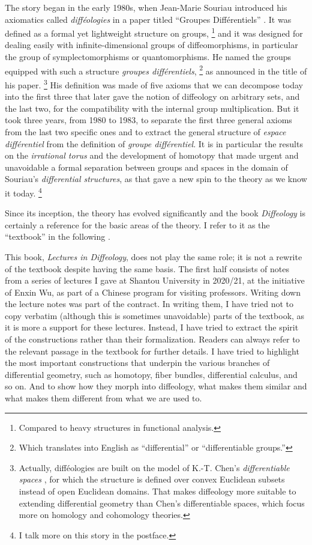 The story began in the early 1980s,
when Jean-Marie Souriau introduced his axiomatics called \emph{difféologies} in a paper titled ``Groupes Différentiels'' \cite{Sou80}.
It was defined as a formal yet lightweight structure on groups,%
\footnote{Compared to heavy structures in functional analysis.}
and it was designed for dealing easily with infinite-dimensional groups of diffeomorphisms,
in particular the group of symplectomorphisms or quantomorphisms.
He named the groups equipped with such a structure \emph{groupes différentiels},%
\footnote{Which translates into English as ``differential'' or ``differentiable groups.''}
as announced in the title of his paper.%
\footnote{Actually,
difféologies are built on the model of K.-T. Chen's \emph{differentiable spaces} \cite{Che77},
for which the structure is defined over convex Euclidean subsets instead of open Euclidean domains.
That makes diffeology more suitable to extending differential geometry than Chen's differentiable spaces,
which focus more on homology and cohomology theories.}
His definition was made of five axioms that we can decompose today into the first three that later gave the notion of diffeology on arbitrary sets,
and the last two,
for the compatibility with the internal group multiplication.
But it took three years,
from 1980 to 1983,
to separate the first three general axioms from the last two specific ones and to extract the general structure of \emph{espace différentiel} from the definition of \emph{groupe différentiel}.
It is in particular the results on the \emph{irrational torus} \cite{DI83} and the development of homotopy \cite{Igl85}
that made urgent and unavoidable a formal separation between groups and spaces in the domain of Souriau's \emph{differential structures},
as that gave a new spin to the theory as we know it today.%
\footnote{I talk more on this story in the postface.}

Since its inception,
the theory has evolved significantly and the book {\it Diffeology} is certainly a reference for the basic areas of the theory.
I refer to it as the ``textbook'' in the following \cite{PIZ13}.

This book,
{\it Lectures in Diffeology},
does not play the same role;
it is not a rewrite of the textbook despite having the same basis.
The first half consists of notes from a series of lectures I gave at Shantou University in 2020/21,
at the initiative of Enxin Wu,
as part of a Chinese program for visiting professors.
Writing down the lecture notes was part of the contract.
In writing them,
I have tried not to copy verbatim (although this is sometimes unavoidable) parts of the textbook,
as it is more a support for these lectures.
Instead,
I have tried to extract the spirit of the constructions rather than their formalization.
Readers can always refer to the relevant passage in the textbook for further details.
I have tried to highlight the most important constructions that underpin the various branches of differential geometry,
such as homotopy,
fiber bundles,
differential calculus,
and so on.
And to show how they morph into diffeology,
what makes them similar and what makes them different from what we are used to.

